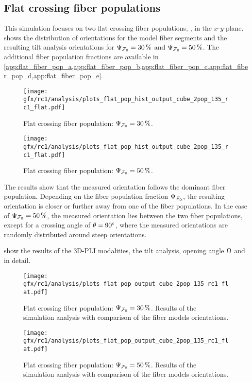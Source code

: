 \subsection{Flat crossing fiber populations}
\label{sec:resCrossFlat}
%
This simulation focuses on two flat crossing fiber populations, \ie{}, in the $x$-$y$-plane.
 shows the distribution of orientations for the model fiber segments and the resulting tilt analysis orientations for $\textnormal{$\Psi_{\textnormal{$\mathcal{F}_0$}}$} = \SI{30}{\percent}$ and $\textnormal{$\Psi_{\textnormal{$\mathcal{F}_0$}}$} = \SI{50}{\percent}$.
The additional fiber population fractions are available in \cref{app:flat_fiber_pop_a,app:flat_fiber_pop_b,app:flat_fiber_pop_c,app:flat_fiber_pop_d,app:flat_fiber_pop_e}.
\par
% 
\begin{figure}[!p]
\centering
\texttt{[image: gfx/rc1/analysis/plots\_flat\_pop\_hist\_output\_cube\_2pop\_135\_rc1\_flat.pdf]}
\caption{Flat crossing fiber population: $\textnormal{$\Psi_{\textnormal{$\mathcal{F}_0$}}$}=\SI{30}{\percent}$.}
\label{fig:flat_03_fiber_pop_hist}
% 
\vspace{2em}
\texttt{[image: gfx/rc1/analysis/plots\_flat\_pop\_hist\_output\_cube\_2pop\_135\_rc1\_flat.pdf]}
\caption{Flat crossing fiber population: $\textnormal{$\Psi_{\textnormal{$\mathcal{F}_0$}}$}=\SI{50}{\percent}$.}
\label{fig:flat_05_fiber_pop_hist}
\end{figure}
%
The results show that the measured orientation follows the dominant fiber population.
Depending on the fiber population fraction $\textnormal{$\Psi_{\textnormal{$\mathcal{F}_0$}}$}$, the resulting orientation is closer or further away from one of the fiber populations.
In the case of $\textnormal{$\Psi_{\textnormal{$\mathcal{F}_0$}}$} = \SI{50}{\percent}$, the measured orientation lies between the two fiber populations, except for a crossing angle of $\textnormal{$\theta$}=\SI{90}{\degree}$, where the measured orientations are randomly distributed around steep orientations.
\par
% 
 show the results of the \ac{3D-PLI} modalities, the tilt analysis, opening angle $\textnormal{$\Omega$}$ and \accvalue{} in detail.
\par
% 
\begin{figure}[!p]
\centering
\texttt{[image: gfx/rc1/analysis/plots\_flat\_pop\_output\_cube\_2pop\_135\_rc1\_flat.pdf]}
\caption{Flat crossing fiber population: $\textnormal{$\Psi_{\textnormal{$\mathcal{F}_0$}}$}=\SI{30}{\percent}$. Results of the simulation analysis with comparison of the fiber models orientations.}
\label{fig:flat_03_fiber_pop_rofl}
\end{figure}
%
\begin{figure}[!p]
\centering
\texttt{[image: gfx/rc1/analysis/plots\_flat\_pop\_output\_cube\_2pop\_135\_rc1\_flat.pdf]}
\caption{Flat crossing fiber population: $\textnormal{$\Psi_{\textnormal{$\mathcal{F}_0$}}$}=\SI{50}{\percent}$. Results of the simulation analysis with comparison of the fiber models orientations.}
\label{fig:flat_05_fiber_pop_rofl}
\end{figure}
